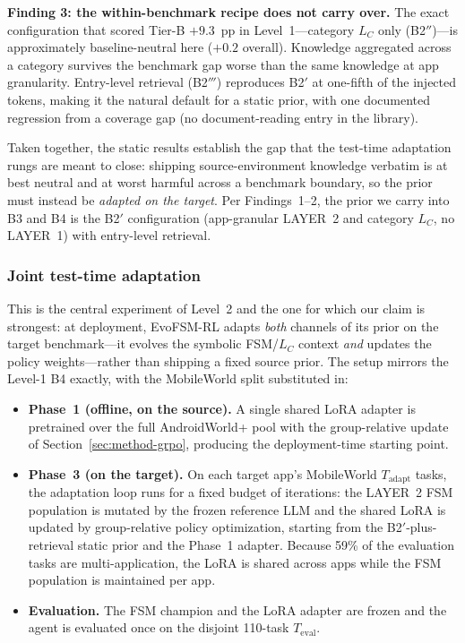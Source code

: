 \textbf{Finding 3: the within-benchmark recipe does not carry over.} The exact
configuration that scored Tier-B $+9.3$~pp in Level~1---category $L_C$ only
(B2$''$)---is approximately baseline-neutral here ($+0.2$ overall). Knowledge
aggregated across a category survives the benchmark gap worse than the same
knowledge at app granularity. Entry-level retrieval (B2$'''$) reproduces B2$'$
at one-fifth of the injected tokens, making it the natural default for a static
prior, with one documented regression from a coverage gap (no
document-reading entry in the library).

Taken together, the static results establish the gap that the test-time
adaptation rungs are meant to close: shipping source-environment knowledge
verbatim is at best neutral and at worst harmful across a benchmark boundary, so
the prior must instead be \emph{adapted on the target}. Per Findings~1--2, the
prior we carry into B3 and B4 is the B2$'$ configuration (app-granular LAYER~2
and category $L_C$, no LAYER~1) with entry-level retrieval.

\subsubsection{Joint test-time adaptation}
\label{sec:exp-cross-joint}

This is the central experiment of Level~2 and the one for which our claim is
strongest: at deployment, EvoFSM-RL adapts \emph{both} channels of its prior on
the target benchmark---it evolves the symbolic FSM/$L_C$ context \emph{and}
updates the policy weights---rather than shipping a fixed source prior. The
setup mirrors the Level-1 B4 exactly, with the MobileWorld split substituted in:

\begin{itemize}
\item \textbf{Phase~1 (offline, on the source).} A single shared LoRA adapter is
pretrained over the full AndroidWorld+ pool with the group-relative update of
Section~\ref{sec:method-grpo}, producing the deployment-time starting point.
\item \textbf{Phase~3 (on the target).} On each target app's MobileWorld
$T_{\text{adapt}}$ tasks, the adaptation loop runs for a fixed budget of
iterations: the LAYER~2 FSM population is mutated by the frozen reference LLM and
the shared LoRA is updated by group-relative policy optimization, starting from
the B2$'$-plus-retrieval static prior and the Phase~1 adapter. Because 59\% of
the evaluation tasks are multi-application, the LoRA is shared across apps while
the FSM population is maintained per app.
\item \textbf{Evaluation.} The FSM champion and the LoRA adapter are frozen and
the agent is evaluated once on the disjoint 110-task $T_{\text{eval}}$.
\end{itemize}

